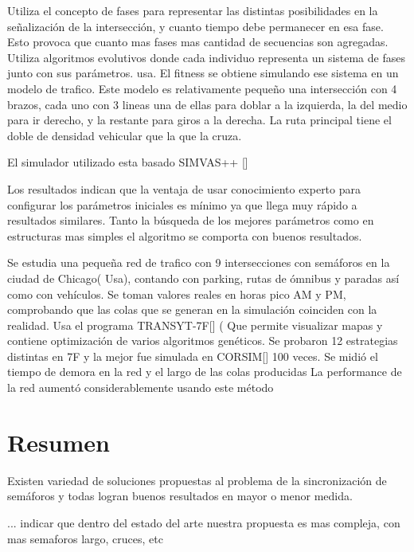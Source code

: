 \begin{itemize}
\begin{item}
Utiliza el concepto de fases para representar las distintas posibilidades en la señalización de la intersección, y cuanto tiempo debe permanecer en esa fase. Esto provoca que cuanto mas fases mas cantidad de secuencias son agregadas.
Utiliza algoritmos evolutivos donde cada individuo representa un sistema de fases junto con sus parámetros. usa. El fitness se obtiene simulando ese sistema en un modelo de trafico. Este modelo es relativamente pequeño una intersección con 4 brazos, cada uno con 3 lineas una de ellas para doblar a la izquierda, la del medio para ir derecho, y la restante para giros a la derecha. La ruta principal tiene el doble de densidad vehicular que la que la cruza.

El simulador utilizado esta basado SIMVAS++ []

Los resultados indican que la ventaja de usar conocimiento experto para configurar los parámetros iniciales es mínimo ya que llega muy rápido a resultados similares. Tanto la búsqueda de los mejores parámetros como en estructuras mas simples el algoritmo se comporta con buenos resultados.
		
	\end{item}	
	
	\begin{item}

Se estudia una pequeña red de trafico con 9 intersecciones con semáforos en la ciudad de Chicago( Usa), contando con parking, rutas de ómnibus y paradas así como con vehículos.  
Se toman valores reales en horas pico AM y PM, comprobando que las colas que se generan en la simulación coinciden con la realidad.
Usa el programa TRANSYT-7F[] ( Que permite visualizar mapas y contiene optimización de varios algoritmos genéticos.
Se probaron 12 estrategias distintas en 7F y la mejor fue simulada en CORSIM[] 100 veces. Se midió el tiempo de demora en la red y el largo de las colas producidas
La performance de la red aumentó considerablemente usando este método	
	\end{item}	

\end{itemize}


\section{Resumen}
Existen variedad de soluciones propuestas al problema de la sincronización de semáforos y todas logran buenos resultados en mayor o menor medida.

... indicar que dentro del estado del arte
nuestra propuesta es mas compleja, con mas semaforos
largo, cruces, etc